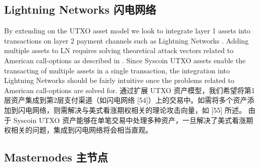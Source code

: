 \documentclass{ctexart}
\begin{document}
\subsection{Lightning Networks 闪电网络}
By extending on the UTXO asset model we look to integrate layer 1 assets into transactions on layer 2 payment channels such as Lightning Networks \cite{Poon16}. Adding multiple assets to LN requires solving theoretical attack vectors related to American call-options as described in \cite{LN}. Since Syscoin UTXO assets enable the transacting of multiple assets in a single transaction, the integration into Lightning Networks should be fairly intuitive once the problems related to American call-options are solved for. 通过扩展 UTXO 资产模型，我们希望将第1层资产集成到第2层支付渠道（如闪电网络 [54]）上的交易中。如需将多个资产添加到闪电网络，则需解决与美式看涨期权相关的理论攻击向量，如 [55] 所述。 由于 Syscoin UTXO 资产能够在单笔交易中处理多种资产，一旦解决了美式看涨期权相关的问题，集成到闪电网络将会相当直观。

\subsection{Masternodes 主节点}
\end{document}
